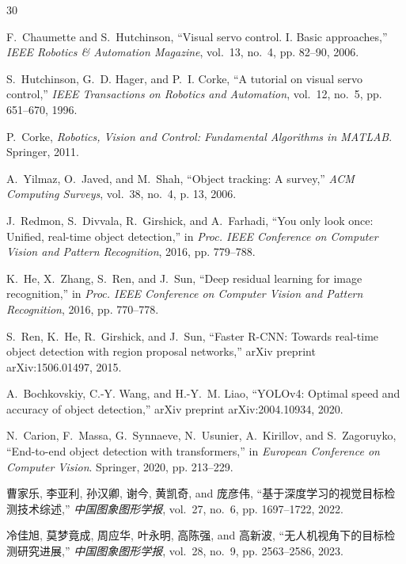 \documentclass[journal]{IEEEtran}
\begin{document}
\begin{thebibliography}{30}

F.~Chaumette and S.~Hutchinson, ``Visual servo control. I. Basic approaches,'' \emph{IEEE Robotics \& Automation Magazine}, vol.~13, no.~4, pp. 82--90, 2006.

S.~Hutchinson, G.~D. Hager, and P.~I. Corke, ``A tutorial on visual servo control,'' \emph{IEEE Transactions on Robotics and Automation}, vol.~12, no.~5, pp. 651--670, 1996.

P.~Corke, \emph{Robotics, Vision and Control: Fundamental Algorithms in MATLAB}. Springer, 2011.

A.~Yilmaz, O.~Javed, and M.~Shah, ``Object tracking: A survey,'' \emph{ACM Computing Surveys}, vol.~38, no.~4, p. 13, 2006.

J.~Redmon, S.~Divvala, R.~Girshick, and A.~Farhadi, ``You only look once: Unified, real-time object detection,'' in \emph{Proc. IEEE Conference on Computer Vision and Pattern Recognition}, 2016, pp. 779--788.

K.~He, X.~Zhang, S.~Ren, and J.~Sun, ``Deep residual learning for image recognition,'' in \emph{Proc. IEEE Conference on Computer Vision and Pattern Recognition}, 2016, pp. 770--778.

S.~Ren, K.~He, R.~Girshick, and J.~Sun, ``Faster R-CNN: Towards real-time object detection with region proposal networks,'' arXiv preprint arXiv:1506.01497, 2015.

A.~Bochkovskiy, C.-Y. Wang, and H.-Y.~M. Liao, ``YOLOv4: Optimal speed and accuracy of object detection,'' arXiv preprint arXiv:2004.10934, 2020.

N.~Carion, F.~Massa, G.~Synnaeve, N.~Usunier, A.~Kirillov, and S.~Zagoruyko, ``End-to-end object detection with transformers,'' in \emph{European Conference on Computer Vision}. Springer, 2020, pp. 213--229.

曹家乐, 李亚利, 孙汉卿, 谢今, 黄凯奇, and 庞彦伟, ``基于深度学习的视觉目标检测技术综述,'' \emph{中国图象图形学报}, vol.~27, no.~6, pp. 1697--1722, 2022.

冷佳旭, 莫梦竟成, 周应华, 叶永明, 高陈强, and 高新波, ``无人机视角下的目标检测研究进展,'' \emph{中国图象图形学报}, vol.~28, no.~9, pp. 2563--2586, 2023.


\end{thebibliography}
\end{document}
